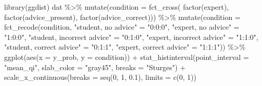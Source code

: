 \documentclass[
  man,
  floatsintext,
  longtable,
  a4paper,
  nolmodern,
  notxfonts,
  notimes,
  colorlinks=true,linkcolor=blue,citecolor=blue,urlcolor=blue]{apa7}
\newenvironment{Shaded}{\begin{snugshade}}{\end{snugshade}}
\newcommand{\AttributeTok}[1]{\textcolor[rgb]{0.40,0.45,0.13}{#1}}
\newcommand{\DecValTok}[1]{\textcolor[rgb]{0.68,0.00,0.00}{#1}}
\newcommand{\FloatTok}[1]{\textcolor[rgb]{0.68,0.00,0.00}{#1}}
\newcommand{\FunctionTok}[1]{\textcolor[rgb]{0.28,0.35,0.67}{#1}}
\newcommand{\NormalTok}[1]{\textcolor[rgb]{0.00,0.23,0.31}{#1}}
\newcommand{\OtherTok}[1]{\textcolor[rgb]{0.00,0.23,0.31}{#1}}
\newcommand{\SpecialCharTok}[1]{\textcolor[rgb]{0.37,0.37,0.37}{#1}}
\newcommand{\StringTok}[1]{\textcolor[rgb]{0.13,0.47,0.30}{#1}}
\begin{document}
\label{cell-fig-margdist1}
\begin{Shaded}
\begin{Highlighting}[]
\FunctionTok{library}\NormalTok{(ggdist)}
\NormalTok{dat }\SpecialCharTok{\%\textgreater{}\%} 
  \FunctionTok{mutate}\NormalTok{(}\AttributeTok{condition =} \FunctionTok{fct\_cross}\NormalTok{(}
    \FunctionTok{factor}\NormalTok{(expert), }\FunctionTok{factor}\NormalTok{(advice\_present), }\FunctionTok{factor}\NormalTok{(advice\_correct))) }\SpecialCharTok{\%\textgreater{}\%}
  \FunctionTok{mutate}\NormalTok{(}\AttributeTok{condition =} \FunctionTok{fct\_recode}\NormalTok{(condition,}
\StringTok{"student, no advice"} \OtherTok{=} \StringTok{"0:0:0"}\NormalTok{, }\StringTok{"expert, no advice"} \OtherTok{=} \StringTok{"1:0:0"}\NormalTok{, }
\StringTok{"student, incorrect advice"} \OtherTok{=} \StringTok{"0:1:0"}\NormalTok{, }\StringTok{"expert, incorrect advice"} \OtherTok{=} \StringTok{"1:1:0"}\NormalTok{,}
\StringTok{"student, correct advice"} \OtherTok{=} \StringTok{"0:1:1"}\NormalTok{, }\StringTok{"expert, correct advice"} \OtherTok{=} \StringTok{"1:1:1"}\NormalTok{)) }\SpecialCharTok{\%\textgreater{}\%} 
  \FunctionTok{ggplot}\NormalTok{(}\FunctionTok{aes}\NormalTok{(}\AttributeTok{x =}\NormalTok{ y\_prob, }\AttributeTok{y =}\NormalTok{ condition)) }\SpecialCharTok{+}
  \FunctionTok{stat\_histinterval}\NormalTok{(}\AttributeTok{point\_interval =} \StringTok{"mean\_qi"}\NormalTok{, }\AttributeTok{slab\_color =} \StringTok{"gray45"}\NormalTok{,}
    \AttributeTok{breaks =} \StringTok{"Sturges"}\NormalTok{) }\SpecialCharTok{+}
  \FunctionTok{scale\_x\_continuous}\NormalTok{(}\AttributeTok{breaks =} \FunctionTok{seq}\NormalTok{(}\DecValTok{0}\NormalTok{, }\DecValTok{1}\NormalTok{, }\FloatTok{0.1}\NormalTok{), }\AttributeTok{limits =} \FunctionTok{c}\NormalTok{(}\DecValTok{0}\NormalTok{, }\DecValTok{1}\NormalTok{))}
\end{Highlighting}
\end{Shaded}
\end{document}

